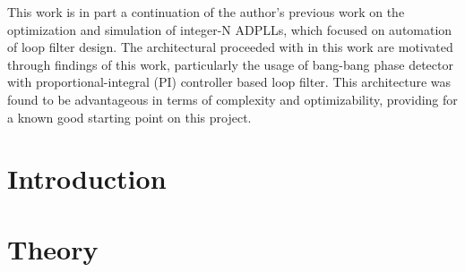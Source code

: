 	\large\fontfamily{\rmdefault}\selectfont 
	\par This work is in part a continuation of the author's previous work \cite{Me} on the optimization and simulation of integer-N ADPLLs, which focused on automation of loop filter design. The architectural proceeded with in this work are motivated through findings of this work, particularly the usage of bang-bang phase detector with proportional-integral (PI) controller based loop filter. This architecture was found to be advantageous in terms of complexity and optimizability, providing for a known good starting point on this project.


	\fontfamily{\sfdefault}\selectfont 
	\thispagestyle{nohdr}
	\null\pagebreak
	\tableofcontents
	\pagebreak
	\listoffigures
	\listoftables


	\fontfamily{\rmdefault}\selectfont 
	\pagebreak
	\FloatBarrier
	
	\FloatBarrier\pagebreak
	\null

	\pagebreak\FloatBarrier

	\section{Introduction}\label{intro}
	
	\pagebreak\FloatBarrier

	\section{Theory}\label{theory}
	
	\FloatBarrier\newpage

